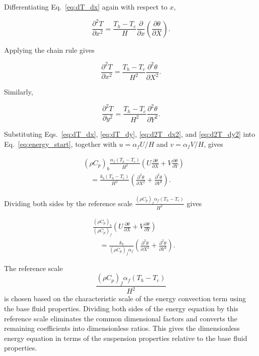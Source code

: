 \documentclass[preprint,3p,number]{elsarticle}
\begin{document}
Differentiating Eq.~\eqref{eq:dT_dx} again with respect to \(x\),

\begin{equation}
\frac{\partial^2T}{\partial x^2}
=
\frac{T_h-T_c}{H}
\frac{\partial}{\partial x}
\left(\frac{\partial\theta}{\partial X}\right).
\end{equation}

Applying the chain rule gives

\begin{equation}
\frac{\partial^2T}{\partial x^2}
=
\frac{T_h-T_c}{H^2}
\frac{\partial^2\theta}{\partial X^2}.
\label{eq:d2T_dx2}
\end{equation}

Similarly,

\begin{equation}
\frac{\partial^2T}{\partial y^2}
=
\frac{T_h-T_c}{H^2}
\frac{\partial^2\theta}{\partial Y^2}.
\label{eq:d2T_dy2}
\end{equation}

Substituting Eqs.~\eqref{eq:dT_dx}, \eqref{eq:dT_dy},
\eqref{eq:d2T_dx2}, and \eqref{eq:d2T_dy2} into
Eq.~\eqref{eq:energy_start}, together with
\(u=\alpha_f U/H\) and \(v=\alpha_f V/H\), gives

\begin{align}
&(\rho C_p)_b
\frac{\alpha_f(T_h-T_c)}{H^2}
\left(
U\frac{\partial\theta}{\partial X}
+
V\frac{\partial\theta}{\partial Y}
\right)
\nonumber\\
&\quad =
\frac{k_b(T_h-T_c)}{H^2}
\left(
\frac{\partial^2\theta}{\partial X^2}
+
\frac{\partial^2\theta}{\partial Y^2}
\right).
\label{eq:energy_substituted}
\end{align}

Dividing both sides by the reference scale \(\displaystyle \frac{(\rho C_p)_f\alpha_f(T_h-T_c)}{H^2}\) gives

\begin{align}
&\frac{(\rho C_p)_b}{(\rho C_p)_f}
\left(
U\frac{\partial\theta}{\partial X}
+
V\frac{\partial\theta}{\partial Y}
\right)
\nonumber\\
&\quad =
\frac{k_b}{(\rho C_p)_f\alpha_f}
\left(
\frac{\partial^2\theta}{\partial X^2}
+
\frac{\partial^2\theta}{\partial Y^2}
\right).
\label{eq:energy_scaled}
\end{align}

The reference scale
\[
\frac{(\rho C_p)_f\alpha_f(T_h-T_c)}{H^2}
\]
is chosen based on the characteristic scale of the energy convection term using the base fluid properties. Dividing both sides of the energy equation by this reference scale eliminates the common dimensional factors and converts the remaining coefficients into dimensionless ratios. This gives the dimensionless energy equation in terms of the suspension properties relative to the base fluid properties.
\end{document}
